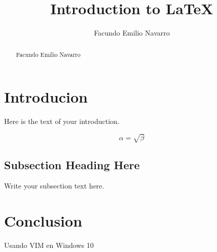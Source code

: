 \documentclass{article}
\begin{document}
\title{Introduction to \LaTeX{}}
\author{Facundo Emilio Navarro}

\maketitle

\begin{abstract}
Facundo Emilio Navarro
\end{abstract}

\section{Introducion}
Here is the text of your introduction.

\begin{equation}
    \label{simple_equation}
    \alpha = \sqrt{ \beta }
\end{equation}

\subsection{Subsection Heading Here}
Write your subsection text here.


\section{Conclusion}
Usando VIM en Windows 10
\end{document}
